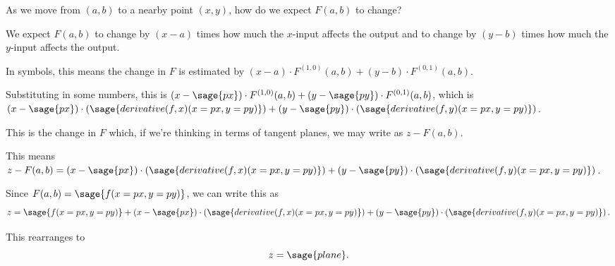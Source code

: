 \documentclass{ximera}
\begin{document}
\begin{exercise}
  \begin{hint}
    As we move from $(a,b)$ to a nearby point $(x,y)$, how do we expect $F(a,b)$ to change?
  \end{hint}

  \begin{hint}
    We expect $F(a,b)$ to change by $(x-a)$ times how much the $x$-input affects the output and to change by $(y-b)$ times how much the $y$-input affects the output.
  \end{hint}

  \begin{hint}
    In symbols, this means the change in $F$ is estimated by $(x-a) \cdot F^{(1,0)}(a,b) + (y-b) \cdot F^{(0,1)}(a,b)$.
  \end{hint}

  \begin{hint}
    Substituting in some numbers, this is
    $(x-\sage{px}) \cdot F^{(1,0)}(a,b) + (y-\sage{py}) \cdot F^{(0,1)}(a,b)$, which is
    $\left(x-\sage{px}\right) \cdot \left( \sage{derivative(f,x)(x=px,y=py)} \right) + \left(y-\sage{py}\right) \cdot \left( \sage{derivative(f,y)(x=px,y=py)} \right)$.
  \end{hint}        

  \begin{hint}
    This is the change in $F$ which, if we're thinking in terms of tangent planes, we may write as $z - F(a,b)$.
  \end{hint}

  \begin{hint}
    This means $z - F(a,b) = \left(x-\sage{px}\right) \cdot \left( \sage{derivative(f,x)(x=px,y=py)} \right) + \left(y-\sage{py}\right) \cdot \left( \sage{derivative(f,y)(x=px,y=py)} \right)$.
  \end{hint}

  \begin{hint}
    Since $F(a,b) = \sage{f(x=px,y=py)}$, we can write this as
    \[
      z =  \sage{f(x=px,y=py)} + \left(x-\sage{px}\right) \cdot \left( \sage{derivative(f,x)(x=px,y=py)} \right) + \left(y-\sage{py}\right) \cdot \left( \sage{derivative(f,y)(x=px,y=py)} \right).
    \]
  \end{hint}

  \begin{hint}
    This rearranges to
    \[
      z = \sage{plane}.
    \]
  \end{hint}
  
\end{exercise}
\end{document}

